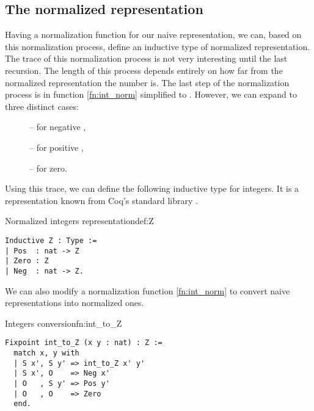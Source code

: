 \subsection{The normalized representation}
Having a normalization function for our naive representation, we can, based on this normalization process, define an inductive type of normalized representation. The trace of this normalization process is not very interesting until the last recursion. The length of this process depends entirely on how far from the normalized representation the number is. The last step of the normalization process is in function \ref{fn:int_norm} simplified to \mcoq{_, _}. However, we can expand \mcoq{_, _} to three distinct cases:
\begin{description}
\item[] -- for negative ,
\item[] -- for positive ,
\item[] -- for zero.
\end{description}
Using this trace, we can define the following inductive type for integers. It is a representation known from Coq's standard library \cite{coqDoc}.
\begin{defi}{Normalized integers representation}{def:Z}
\begin{verbatim}
Inductive Z : Type :=
| Pos  : nat -> Z
| Zero : Z
| Neg  : nat -> Z.
\end{verbatim}
\end{defi}
We can also modify a normalization function \ref{fn:int_norm} to convert naive representations into normalized ones.
\begin{func}{Integers conversion}{fn:int_to_Z}
\begin{verbatim}
Fixpoint int_to_Z (x y : nat) : Z :=
  match x, y with
  | S x', S y' => int_to_Z x' y'
  | S x', O    => Neg x'
  | O   , S y' => Pos y'
  | O   , O    => Zero
  end.
\end{verbatim}
\end{func}
